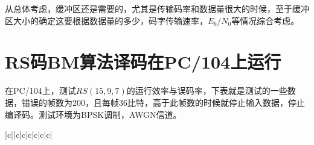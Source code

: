 从总体考虑，缓冲区还是需要的，尤其是传输码率和数据量很大的时候，至于缓冲区大小的确定这要根据数据量的多少，码字传输速率，$E_b/N_0$等情况综合考虑。
\section{RS码BM算法译码在PC/104上运行}
在PC/104上，测试$RS(15,9,7)$的运行效率与误码率，下表就是测试的一些数据，错误的帧数为200，且每帧36比特，高于此帧数的时候就停止输入数据，停止编译码。测试环境为BPSK调制，AWGN信道。
\begin{longtable}{|c||c|c|c|c|c|c|}
\caption{$RS(15,9,7)$测试数据表}
\label{tab:5.3}\\ 

\endfirsthead

\\


\endhead


\end{longtable}
